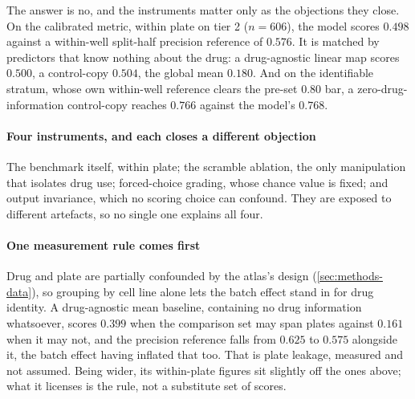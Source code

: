 \noindent
The answer is no, and the instruments matter only as the objections they close.
On the calibrated metric, within plate on tier 2 ($n = \num{606}$), the model
scores $0.498$ against a within-well split-half precision reference of
$0.576$. It is matched by predictors that know
nothing about the drug: a drug-agnostic linear map scores $0.500$, a
control-copy $0.504$, the global mean $0.180$. And on the identifiable stratum,
whose own within-well reference clears the pre-set $0.80$ bar, a
zero-drug-information control-copy reaches $0.766$ against the model's $0.768$.

\paragraph{Four instruments, and each closes a different objection} The
benchmark itself, within plate; the scramble ablation, the only manipulation
that isolates drug use; forced-choice grading, whose chance value is fixed; and
output invariance, which no scoring choice can confound. They are exposed to
different artefacts, so no single one explains all four.

\paragraph{One measurement rule comes first} Drug and plate are partially
confounded by the atlas's design
(\cref{sec:methods-data}), so grouping by cell line alone lets the batch effect
stand in for drug identity. A drug-agnostic mean baseline, containing no drug
information whatsoever, scores $0.399$ when the comparison set may span plates
against $0.161$ when it may not, and the precision reference falls from $0.625$
to $0.575$ alongside it, the batch
effect having inflated that too. That is plate leakage, measured and not
assumed. Being wider, its within-plate figures sit slightly off the ones above;
what it licenses is the rule, not a substitute set of scores.

